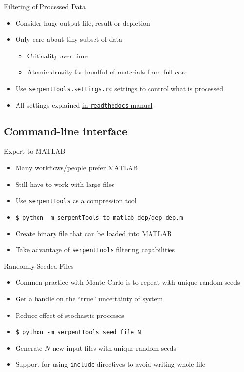 \documentclass{beamer}
\newcommand{\st}{\texttt{serpentTools} }
\begin{document}
\begin{frame}{Filtering of Processed Data}
    \begin{itemize}
        \item Consider huge output file, result or depletion
        \item Only care about tiny subset of data
        \begin{itemize}
            \item Criticality over time
            \item Atomic density for handful of materials from full core
        \end{itemize}
        \item Use \texttt{serpentTools.settings.rc} settings to control what is processed
        \item{All settings explained \href{https://serpent-tools.readthedocs.io/en/latest/settingsTop.html}{in \texttt{readthedocs} manual}}
    \end{itemize}
\end{frame}

\subsection{Command-line interface}

\begin{frame}{Export to MATLAB}
    \begin{itemize}
        \item Many workflows/people prefer MATLAB
        \item Still have to work with large files
        \item Use \st as a compression tool
        \item \texttt{\$ python -m serpentTools to-matlab dep/dep\_dep.m}
        \item Create binary file that can be loaded into MATLAB
        \item Take advantage of \st filtering capabilities
    \end{itemize}
\end{frame}

\begin{frame}{Randomly Seeded Files}
    \begin{itemize}
        \item Common practice with Monte Carlo is to repeat with unique random seeds
        \item Get a handle on the ``true'' uncertainty of system
        \item Reduce effect of stochastic processes
        \item \texttt{\$ python -m serpentTools seed file N}
        \item Generate $N$ new input files with unique random seeds
        \item Support for using \texttt{include} directives to avoid writing whole file
    \end{itemize}
\end{frame}
\end{document}
